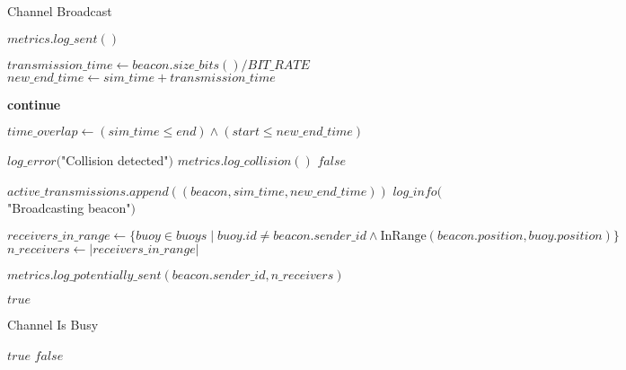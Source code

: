 \documentclass{article}
\begin{document}
\begin{algorithm}
\caption{Channel Broadcast}
\begin{algorithmic}[1]
        \State $metrics.log\_sent()$
    \EndIf
    
    \State $transmission\_time \gets beacon.size\_bits() / BIT\_RATE$
    \State $new\_end\_time \gets sim\_time + transmission\_time$
    
            \State \textbf{continue} 
        \EndIf
        
        \State $time\_overlap \gets (sim\_time \leq end) \land (start \leq new\_end\_time)$ 
        
            \State $log\_error($"Collision detected"$)$
                \State $metrics.log\_collision()$
            \EndIf
            \State \Return $false$ 
        \EndIf
    \EndFor
    
    \State $active\_transmissions.append((beacon, sim\_time, new\_end\_time))$
    \State $log\_info($"Broadcasting beacon"$)$
    
    \State $receivers\_in\_range \gets \{buoy \in buoys \mid buoy.id \neq beacon.sender\_id \land \text{InRange}(beacon.position, buoy.position)\}$
    \State $n\_receivers \gets |receivers\_in\_range|$
    
        \State $metrics.log\_potentially\_sent(beacon.sender\_id, n\_receivers)$
    \EndIf
    
    \State \Return $true$
\EndProcedure
\end{algorithmic}
\end{algorithm}

\begin{algorithm}
\caption{Channel Is Busy}
\begin{algorithmic}[1]
            \State \Return $true$
        \EndIf
    \EndFor
    \State \Return $false$
\EndProcedure
\end{algorithmic}
\end{algorithm}
\end{document}
